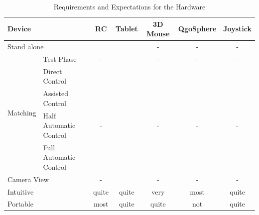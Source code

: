 \begin{table}[H]		%
	\begin{center}
 \begin{tabular}{ll|ccccc}
 \hline
\multicolumn{2}{l|}{Device}	& RC 	& Tablet 	&3D Mouse	&QgoSphere	&Joystick  \\
	\toprule[1.25pt]				%
	\multicolumn{2}{l|}{Stand alone}							&\checkmark		&\checkmark		&-			&-			&-\\
	\hline%
	\multirow{5}{*}{Matching}		&Test Phase					&-				&\checkmark		&-			&-			&-\\
									&Direct Control				&\checkmark		&\checkmark		&\checkmark	&\checkmark	&\checkmark\\
									&Assisted Control			&\checkmark		&\checkmark		&\checkmark	&\checkmark	&\checkmark\\
									&Half Automatic Control		&-				&\checkmark		&-			&-			&- \\
									&Full Automatic Control		&-				&\checkmark		&-			&-			&-\\
	
	\hline%
	\multicolumn{2}{l|}{Camera View}							&-				&\checkmark		&-			&-			&-\\
	\hline%
	\multicolumn{2}{l|}{Intuitive}								&quite	&quite	&very&most&quite\\
	\hline%
	\multicolumn{2}{l|}{Portable}								&most	&quite	&quite&not\footnotemark&quite\\
		
	\bottomrule[1.25pt]
	\end{tabular}
	\caption[Requirements and Expectations for the Hardware]{Requirements and Expectations for the Hardware}
	\label{requirements and expectations for hardware}
	\end{center}
\end{table}

